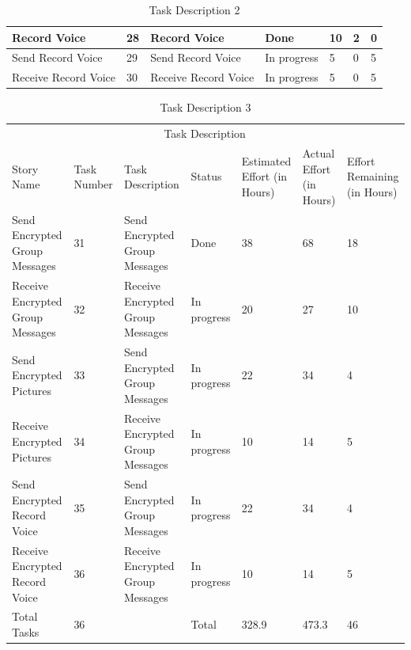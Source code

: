 \documentclass[a4paper]{article}
\begin{document}
\begin{table}
\begin{tabular}{p{3cm} p{1cm} p{3.5cm} p{1cm} p{1cm} p{1cm} p{1cm}}
 Record Voice & 28 & Record Voice & Done & 10 & 2 & 0\\ 
 \midrule
 
 Send Record Voice & 29 & Send Record Voice & In progress & 5 & 0 & 5\\ 
 \midrule
 
 Receive Record Voice & 30 & Receive Record Voice & In progress & 5 & 0 & 5\\ 
\hline
\end{tabular}
\caption{Task Description 2} %
\label{tab:template} %
\end{table}

\pagebreak


\begin{table} 
\begin{tabular}{p{3cm} p{1cm} p{3.5cm} p{1cm} p{1cm} p{1cm} p{1cm}} 
\hline %
& \multicolumn{5}{c}{Task Description} \\
\cmidrule(l){2-7}
Story Name & Task Number & Task Description & Status & Estimated Effort (in Hours) & Actual Effort (in Hours) & Effort Remaining (in Hours)\\ %
\hline

  Send Encrypted Group Messages & 31 & Send Encrypted Group Messages & Done & 38 & 68 & 18\\ 
 \midrule
 
 Receive Encrypted Group Messages & 32 & Receive Encrypted Group Messages & In progress & 20 & 27 & 10\\ 
 \midrule

 
  Send Encrypted Pictures & 33 & Send Encrypted Group Messages & In progress & 22 & 34 & 4\\ 
 \midrule
 
 Receive Encrypted Pictures & 34 & Receive Encrypted Group Messages & In progress & 10 & 14 & 5\\ 
 \midrule
 
  
  Send Encrypted Record Voice & 35 & Send Encrypted Group Messages & In progress & 22 & 34 & 4\\ 
 \midrule
 
 Receive Encrypted Record Voice & 36 & Receive Encrypted Group Messages & In progress & 10 & 14 & 5\\ 
\hline
Total Tasks & 36 & & Total & 328.9 & 473.3 & 46\\
\hline
\end{tabular}
\caption{Task Description 3} %
\label{tab:template} %
\end{table}
\end{document}
